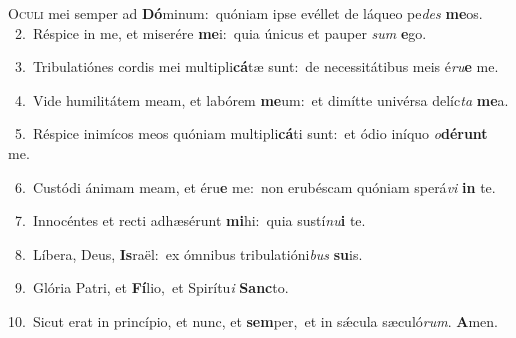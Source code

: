 \lettrine{\initial\textcolor{\initialcolor}{O}}{culi} mei semper ad \textbf{Dó}\-minum:~\star quóniam ipse evéllet de láqueo pe\textit{des} \textbf{me}\-os.\\
{\numbfont\textcolor{\numbcolor}{~2.}}~Réspice in me, et miserére \textbf{me}\-i:~\star quia únicus et pauper \textit{sum} \textbf{e}\-go.\par
{\numbfont\textcolor{\numbcolor}{~3.}}~Tribulatiónes cordis mei multipli\-\textbf{cá}\-tæ sunt:~\star de necessitátibus meis é\-\textit{ru}\-\textbf{e} me.\par
{\numbfont\textcolor{\numbcolor}{~4.}}~Vide humilitátem meam, et labórem \textbf{me}\-um:~\star et dimítte univérsa delíc\textit{ta} \textbf{me}\-a.\par
{\numbfont\textcolor{\numbcolor}{~5.}}~Réspice inimícos meos quóniam multipli\-\textbf{cá}\-ti sunt:~\star et ódio iníquo \textit{o}\-\textbf{dé}\textbf{runt} me.\par
{\numbfont\textcolor{\numbcolor}{~6.}}~Custódi ánimam meam, et éru\textbf{e} me:~\star non erubéscam quóniam sperá\textit{vi} \textbf{in} te.\par
{\numbfont\textcolor{\numbcolor}{~7.}}~Innocéntes et recti adhæsérunt \textbf{mi}\-hi:~\star quia sustí\-\textit{nu}\-\textbf{i} te.\par
{\numbfont\textcolor{\numbcolor}{~8.}}~Líbera, Deus, \textbf{Is}\-raël:~\star ex ómnibus tribulatióni\textit{bus} \textbf{su}\-is.\par
{\numbfont\textcolor{\numbcolor}{~9.}}~Glória Patri, et \textbf{Fí}\-lio,~\star et Spirítu\textit{i} \textbf{Sanc}\-to.\par
{\numbfont\textcolor{\numbcolor}{10.}}~Sicut erat in princípio, et nunc, et \textbf{sem}\-per,~\star et in sǽcula sæculó\-\textit{rum}\-. \textbf{A}\-men.\par
